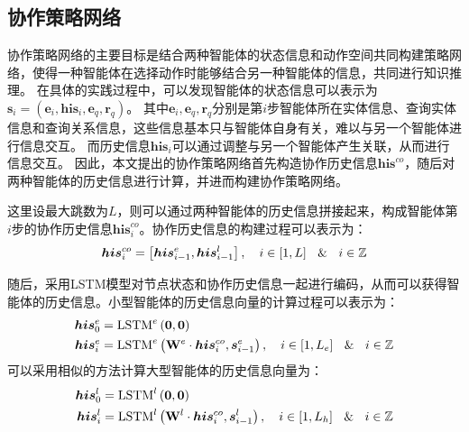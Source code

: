 \documentclass[algorithmlist, AutoFakeBold, AutoFakeSlant, figurelist, tablelist, nomlist, engineering]{seuthesix}
\begin{document}
\subsection{协作策略网络}
协作策略网络的主要目标是结合两种智能体的状态信息和动作空间共同构建策略网络，使得一种智能体在选择动作时能够结合另一种智能体的信息，共同进行知识推理。
在具体的实践过程中，可以发现智能体的状态信息可以表示为$\bm{s}_i = (\bm{e}_i, \bm{his}_i, \bm{e}_q, \bm{r}_q)$。
其中$\bm{e}_i, \bm{e}_q, \bm{r}_q$分别是第$i$步智能体所在实体信息、查询实体信息和查询关系信息，这些信息基本只与智能体自身有关，难以与另一个智能体进行信息交互。
而历史信息$\bm{his}_i$可以通过调整与另一个智能体产生关联，从而进行信息交互。
因此，本文提出的协作策略网络首先构造协作历史信息$\bm{his}^{co}$，随后对两种智能体的历史信息进行计算，并进而构建协作策略网络。

这里设最大跳数为$L$，则可以通过两种智能体的历史信息拼接起来，构成智能体第$i$步的协作历史信息$\bm{his}_i^{co}$。协作历史信息的构建过程可以表示为：
\begin{equation}
  \bm{his}_{i}^{co} = \left[\bm{his}_{i-1}^e, \bm{his}_{i-1}^l\right], \quad i \in [1, L] \  \And \  i \in \mathbb{Z}
  \label{his_1}
\end{equation}

随后，采用LSTM模型对节点状态和协作历史信息一起进行编码，从而可以获得智能体的历史信息。小型智能体的历史信息向量的计算过程可以表示为：
\begin{equation}
  \begin{aligned}
    \bm{his}_0^e &= \operatorname{LSTM}^e\left(\bm{0}, \bm{0}\right) \\
    \bm{his}_i^e &= \operatorname{LSTM}^e\left(\mathbf{W}^e \cdot \bm{his}_i^{co}, \bm{s}_{i-1}^e\right),\quad i \in [1, L_e] \  \And \  i \in \mathbb{Z}
  \end{aligned}
  \label{his_2}
\end{equation}
可以采用相似的方法计算大型智能体的历史信息向量为：
\begin{equation}
  \begin{aligned}
    \bm{his}_0^l &=\operatorname{LSTM}^l\left(\bm{0}, \bm{0}\right) \\
    \bm{his}_i^l &= \operatorname{LSTM}^l\left(\mathbf{W}^l \cdot \bm{his}_i^{co}, \bm{s}_{i-1}^l\right),\quad i \in [1, L_h] \  \And \  i \in \mathbb{Z}
  \end{aligned}
  \label{his_3}
\end{equation}
\end{document}

